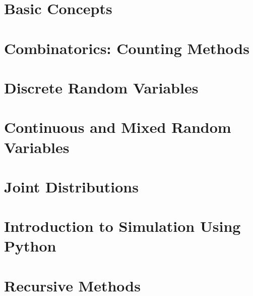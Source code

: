 \documentclass[11pt]{book}
\begin{document}
{}  
\tableofcontents

\chapter{Basic Concepts}


\chapter{Combinatorics: Counting Methods}


\chapter{Discrete Random Variables}


\chapter{Continuous and Mixed Random Variables}


\chapter{Joint Distributions}


\chapter{Introduction to Simulation Using Python}


\chapter{Recursive Methods}

\end{document}
